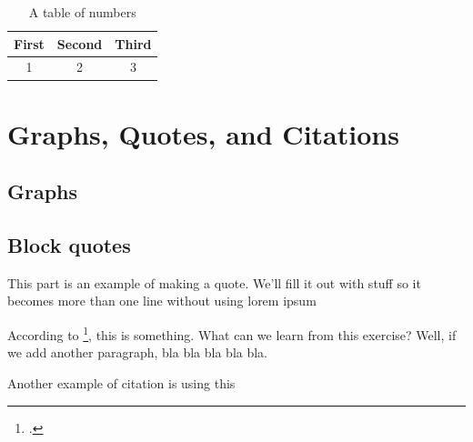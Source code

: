 \begin{table}[h]
	\caption{A table of numbers}
	\begin{center}
		\begin{tabular}{|c|c|c|}
				\hline
			First&Second&Third\\
				\hline
			1&2&3\\
				\hline
		\end{tabular}
	\end{center}
\end{table}

\chapter{Graphs, Quotes, and Citations}
\lipsum[1-2]

\section{Graphs}

\section{Block quotes}
This part is an example of making a quote. We'll fill it out with stuff so it becomes more than one line without using lorem ipsum
\begin{quote}
	\lipsum[1-2] \parencite{wombat2016} %
\end{quote}

According to \footcite[Quote from][According to me, this is really neat]{lion2010}, this is something. What can we learn from this exercise? Well, if we add another paragraph, bla bla bla bla bla.

Another example of citation is using this \parencite[see][page 12]{wikibook}

